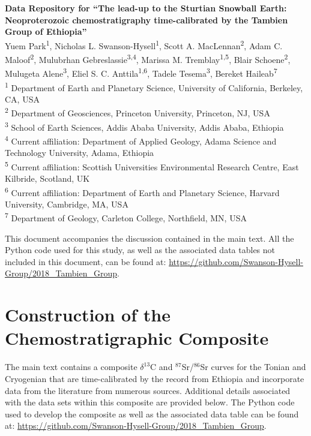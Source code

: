 \documentclass[11pt,letterpaper]{article}
\newcommand{\dC}{$\delta^{13}$C\xspace}
\newcommand{\SrSr}{$^{87}$Sr/$^{86}$Sr\xspace}
\begin{document}
\begin{flushleft}
{\Large \textbf{Data Repository for ``The lead-up to the Sturtian Snowball Earth: Neoproterozoic chemostratigraphy time-calibrated by the Tambien Group of Ethiopia''}}
\\
Yuem Park\textsuperscript{1},
Nicholas L. Swanson-Hysell\textsuperscript{1},
Scott A. MacLennan\textsuperscript{2},
Adam C. Maloof\textsuperscript{2},
Mulubrhan Gebreslassie\textsuperscript{3,4},
Marissa M. Tremblay\textsuperscript{1,5},
Blair Schoene\textsuperscript{2},
Mulugeta Alene\textsuperscript{3},
Eliel S. C. Anttila\textsuperscript{1,6},
Tadele Tesema\textsuperscript{3},
Bereket Haileab\textsuperscript{7}
\\
\bigskip
\textsuperscript{1} Department of Earth and Planetary Science, University of California, Berkeley, CA, USA
\\
\textsuperscript{2} Department of Geosciences, Princeton University, Princeton, NJ, USA
\\
\textsuperscript{3} School of Earth Sciences, Addis Ababa University, Addis Ababa, Ethiopia
\\
\textsuperscript{4} Current affiliation: Department of Applied Geology, Adama Science and Technology University, Adama, Ethiopia
\\
\textsuperscript{5} Current affiliation: Scottish Universities Environmental Research Centre, East Kilbride, Scotland, UK
\\
\textsuperscript{6} Current affiliation: Department of Earth and Planetary Science, Harvard University, Cambridge, MA, USA
\\
\textsuperscript{7} Department of Geology, Carleton College, Northfield, MN, USA
\bigskip

\end{flushleft}

\linenumbers

This document accompanies the discussion contained in the main text. All the Python code used for this study, as well as the associated data tables not included in this document, can be found at: \url{https://github.com/Swanson-Hysell-Group/2018_Tambien_Group}.

\clearpage

\section*{Construction of the Chemostratigraphic Composite}

The main text contains a composite \dC and \SrSr curves for the Tonian and Cryogenian that are time-calibrated by the record from Ethiopia and incorporate data from the literature from numerous sources. Additional details associated with the data sets within this composite are provided below. The Python code used to develop the composite as well as the associated data table can be found at: \url{https://github.com/Swanson-Hysell-Group/2018_Tambien_Group}.
\end{document}
